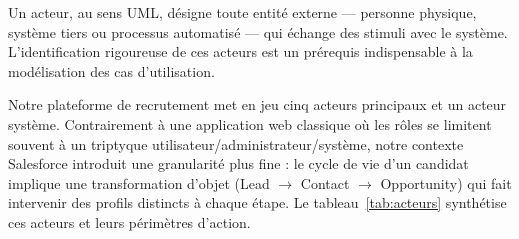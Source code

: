 Un acteur, au sens UML, désigne toute entité externe — personne physique, système tiers ou processus automatisé — qui échange des stimuli avec le système. L'identification rigoureuse de ces acteurs est un prérequis indispensable à la modélisation des cas d'utilisation.

Notre plateforme de recrutement met en jeu cinq acteurs principaux et un acteur système. Contrairement à une application web classique où les rôles se limitent souvent à un triptyque utilisateur/administrateur/système, notre contexte Salesforce introduit une granularité plus fine : le cycle de vie d'un candidat implique une transformation d'objet (Lead $\rightarrow$ Contact $\rightarrow$ Opportunity) qui fait intervenir des profils distincts à chaque étape. Le tableau~\ref{tab:acteurs} synthétise ces acteurs et leurs périmètres d'action.

